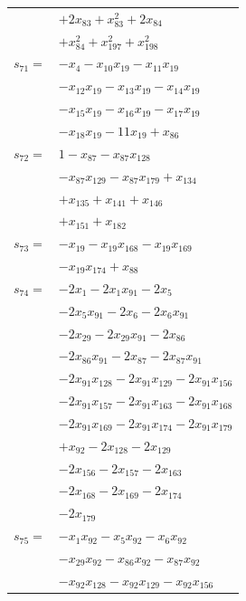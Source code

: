 \begin{longtable}{@{}r@{\;}l@{}}
 & \(\displaystyle +2x_{83} +x_{83}^{2} +2x_{84}\) \\
 & \(\displaystyle +x_{84}^{2} +x_{197}^{2} +x_{198}^{2}\) \\[3pt]
\(s_{71}=\) & \(\displaystyle -x_{4} -x_{10}x_{19} -x_{11}x_{19}\) \\
 & \(\displaystyle -x_{12}x_{19} -x_{13}x_{19} -x_{14}x_{19}\) \\
 & \(\displaystyle -x_{15}x_{19} -x_{16}x_{19} -x_{17}x_{19}\) \\
 & \(\displaystyle -x_{18}x_{19} -11x_{19} +x_{86}\) \\[3pt]
\(s_{72}=\) & \(\displaystyle 1 -x_{87} -x_{87}x_{128}\) \\
 & \(\displaystyle -x_{87}x_{129} -x_{87}x_{179} +x_{134}\) \\
 & \(\displaystyle +x_{135} +x_{141} +x_{146}\) \\
 & \(\displaystyle +x_{151} +x_{182}\) \\[3pt]
\(s_{73}=\) & \(\displaystyle -x_{19} -x_{19}x_{168} -x_{19}x_{169}\) \\
 & \(\displaystyle -x_{19}x_{174} +x_{88}\) \\[3pt]
\(s_{74}=\) & \(\displaystyle -2x_{1} -2x_{1}x_{91} -2x_{5}\) \\
 & \(\displaystyle -2x_{5}x_{91} -2x_{6} -2x_{6}x_{91}\) \\
 & \(\displaystyle -2x_{29} -2x_{29}x_{91} -2x_{86}\) \\
 & \(\displaystyle -2x_{86}x_{91} -2x_{87} -2x_{87}x_{91}\) \\
 & \(\displaystyle -2x_{91}x_{128} -2x_{91}x_{129} -2x_{91}x_{156}\) \\
 & \(\displaystyle -2x_{91}x_{157} -2x_{91}x_{163} -2x_{91}x_{168}\) \\
 & \(\displaystyle -2x_{91}x_{169} -2x_{91}x_{174} -2x_{91}x_{179}\) \\
 & \(\displaystyle +x_{92} -2x_{128} -2x_{129}\) \\
 & \(\displaystyle -2x_{156} -2x_{157} -2x_{163}\) \\
 & \(\displaystyle -2x_{168} -2x_{169} -2x_{174}\) \\
 & \(\displaystyle -2x_{179}\) \\[3pt]
\(s_{75}=\) & \(\displaystyle -x_{1}x_{92} -x_{5}x_{92} -x_{6}x_{92}\) \\
 & \(\displaystyle -x_{29}x_{92} -x_{86}x_{92} -x_{87}x_{92}\) \\
 & \(\displaystyle -x_{92}x_{128} -x_{92}x_{129} -x_{92}x_{156}\) \\

\end{longtable}
